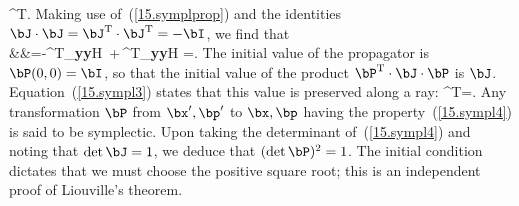 \cdot\bJ^{\rm T}.
\en
Making use of~(\ref{15.symplprop}) and the identities $\bJ\cdot\bJ=
\bJ^{\rm T}\cdot\bJ^{\rm T}=-\bI$, we find that
\eqa \label{15.sympl3}  \nonumber \\
&&\mbox{}=-\bP^{\rm T}\cdot\p_{\mbox{\scriptsize\bf y\bf y}}H\cdot\bP
\,+\,\bP^{\rm T}\cdot\p_{\mbox{\scriptsize\bf y\bf y}}H
\cdot\bP=\bzero.
\ena
The initial value of the propagator is
$\bP(0,0)=\bI$, so that the initial value of
the product $\bP^{\rm T}\cdot\bJ\cdot\bP$ is $\bJ$.
Equation~(\ref{15.sympl3}) states that
this value is preserved along a ray:
\eq \label{15.sympl4}
\bP^{\rm T}\cdot\bJ\cdot\bP=\bJ.
\en
Any transformation $\bP$ from $\bx',\bp'$ to $\bx,\bp$ having
the property~(\ref{15.sympl4}) is said to be symplectic.  Upon taking
the determinant of~(\ref{15.sympl4}) and noting that ${\rm det}\,\bJ=1$,
we deduce that $({\rm det}\,\bP)^2=1$.  The initial condition dictates
that we must choose the positive square root; this is an independent
proof of Liouville's theorem.

